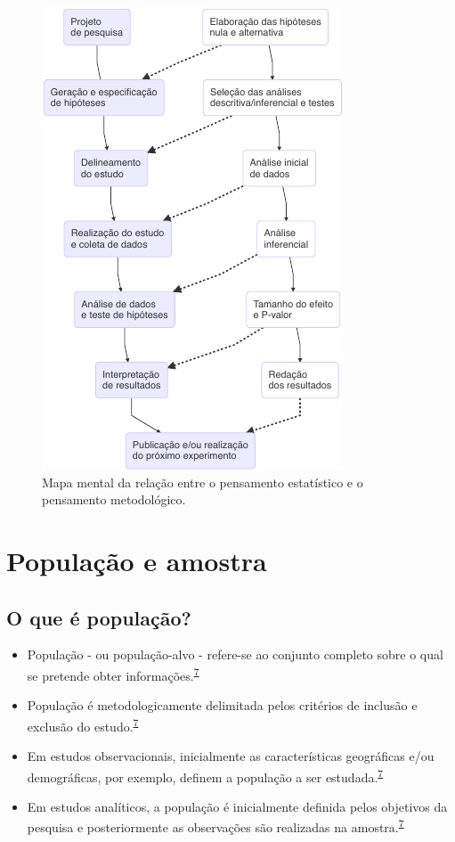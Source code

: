\documentclass[
  a4paper,
]{book}
\begin{document}
\begin{figure}

{\centering \includegraphics{Ciencia-com-R_files/figure-latex/unnamed-chunk-2-1} 

}

\caption{Mapa mental da relação entre o pensamento estatístico e o pensamento metodológico.}\label{fig:unnamed-chunk-2}
\end{figure}

\hypertarget{populacao-amostra}{%
\section{População e amostra}\label{populacao-amostra}}

\hypertarget{o-que-uxe9-populauxe7uxe3o}{%
\subsection{O que é população?}\label{o-que-uxe9-populauxe7uxe3o}}

\begin{itemize}
\item
  População - ou população-alvo - refere-se ao conjunto completo sobre o qual se pretende obter informações.\textsuperscript{\protect\hyperlink{ref-Banerjee2010}{7}}
\item
  População é metodologicamente delimitada pelos critérios de inclusão e exclusão do estudo.\textsuperscript{\protect\hyperlink{ref-Banerjee2010}{7}}
\item
  Em estudos observacionais, inicialmente as características geográficas e/ou demográficas, por exemplo, definem a população a ser estudada.\textsuperscript{\protect\hyperlink{ref-Banerjee2010}{7}}
\item
  Em estudos analíticos, a população é inicialmente definida pelos objetivos da pesquisa e posteriormente as observações são realizadas na amostra.\textsuperscript{\protect\hyperlink{ref-Banerjee2010}{7}}
\end{itemize}
\end{document}
